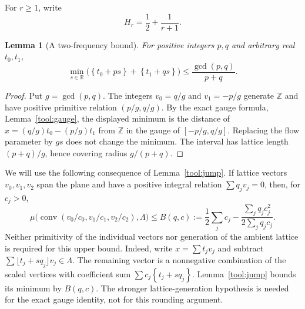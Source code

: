\documentclass[11pt,a4paper]{article}
\newtheorem{lemma}[theorem]{Lemma}
\theoremstyle{remark}\newtheorem{remark}[theorem]{Remark}
\DeclareMathOperator{\conv}{conv}
\newcommand{\R}{\mathbb R}\newcommand{\Z}{\mathbb Z}
\newcommand{\fr}[1]{\left\{#1\right\}}\newcommand{\one}{\mathbf1}
\begin{document}
For $r\ge1$, write
\begin{equation}\label{rr:eq:H}
 H_r=\frac12+\frac1{r+1}.
\end{equation}

\begin{lemma}[A two-frequency bound]\label{rr:lem:twofrequency}
For positive integers $p,q$ and arbitrary real $t_0,t_1$,
\[
 \min_{s\in\R}\bigl(\fr{t_0+ps}+\fr{t_1+qs}\bigr)
 \le\frac{\gcd(p,q)}{p+q}.
\]
\end{lemma}
\begin{proof}
Put $g=\gcd(p,q)$.  The integers $v_0=q/g$ and $v_1=-p/g$
generate $\Z$ and have positive primitive relation $(p/g,q/g)$.
By the exact gauge formula, Lemma~\ref{tool:gauge}, the displayed
minimum is the distance of
$x=(q/g)t_0-(p/g)t_1$ from $\Z$ in the gauge of
$[-p/g,q/g]$.  Replacing the flow parameter by $gs$ does not change
the minimum.  The interval has lattice length $(p+q)/g$, hence
covering radius $g/(p+q)$.
\end{proof}

We will use the following consequence of Lemma~\ref{tool:jump}.
If lattice vectors $v_0,v_1,v_2$ span the plane and have a positive
integral relation $\sum q_jv_j=0$, then, for $c_j>0$,
\begin{equation}\label{rr:eq:trianglebound}
 \mu\bigl(\conv(v_0/c_0,v_1/c_1,v_2/c_2),\Lambda\bigr)
 \le B(q,c):=
 \frac12\sum_jc_j-
 \frac{\sum_jq_jc_j^2}{2\sum_jq_jc_j}.
\end{equation}
Neither primitivity of the individual vectors nor generation of the
ambient lattice is required for this upper bound.  Indeed, write
$x=\sum t_jv_j$ and subtract
$\sum\lfloor t_j+sq_j\rfloor v_j\in\Lambda$.  The remaining vector
is a nonnegative combination of the scaled vertices with coefficient
sum $\sum c_j\fr{t_j+sq_j}$.  Lemma~\ref{tool:jump} bounds its
minimum by $B(q,c)$.  The stronger lattice-generation hypothesis is
needed for the exact gauge identity, not for this rounding argument.
\end{document}
